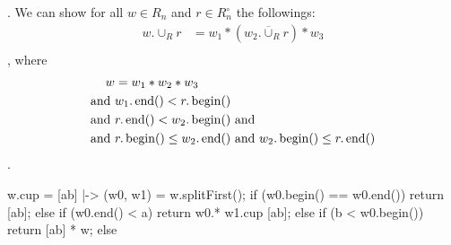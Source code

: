. We can show for all $w\in R_n$ and $r\in R_n^\circ$ the followings:
\begin{equation}\begin{split}
	w.\cup_R r &= w_1 * (w_2.\overline{\cup}_R r) * w_3 \\
\end{split}\end{equation}
, where 
\begin{equation}\begin{split}
	w &= w_1 * w_2 * w_3 \\
	\text{and } & w_1.\operatorname{end}() < r.\operatorname{begin}() \\
	\text{and } & r.\operatorname{end}() < w_2.\operatorname{begin}() \text{ and} \\
	\text{and } & r.\operatorname{begin}() \le w_2.\operatorname{end}() 
	\text{ and } w_2.\operatorname{begin}() \le r.\operatorname{end}() \\
\end{split}\end{equation}
.
\begin{cprog}
w.cup = { [ab] |->
	(w0, w1) = w.splitFirst();
	if (w0.begin() == w0.end()) {
		return [ab];
	} else if (w0.end() < a) {
		return w0.* w1.cup [ab];
	} else if (b < w0.begin()) {
		return [ab] * w;
	} else {
	}
}
\end{cprog}

